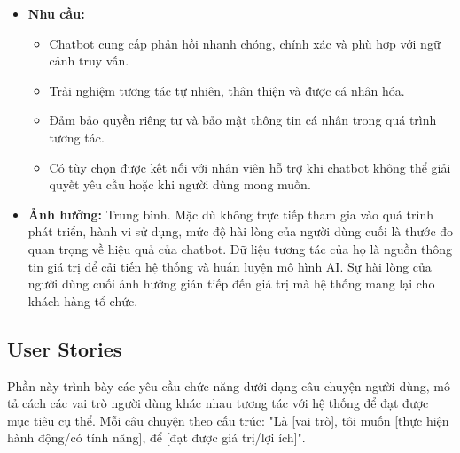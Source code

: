 \begin{itemize}
    \item \textbf{Nhu cầu:}
    \begin{itemize}
        \item Chatbot cung cấp phản hồi nhanh chóng, chính xác và phù hợp với ngữ cảnh truy vấn.
        \item Trải nghiệm tương tác tự nhiên, thân thiện và được cá nhân hóa.
        \item Đảm bảo quyền riêng tư và bảo mật thông tin cá nhân trong quá trình tương tác.
        \item Có tùy chọn được kết nối với nhân viên hỗ trợ khi chatbot không thể giải quyết yêu cầu hoặc khi người dùng mong muốn.
    \end{itemize}
    \item \textbf{Ảnh hưởng:} Trung bình. Mặc dù không trực tiếp tham gia vào quá trình phát triển, hành vi sử dụng, mức độ hài lòng của người dùng cuối là thước đo quan trọng về hiệu quả của chatbot. Dữ liệu tương tác của họ là nguồn thông tin giá trị để cải tiến hệ thống và huấn luyện mô hình AI. Sự hài lòng của người dùng cuối ảnh hưởng gián tiếp đến giá trị mà hệ thống mang lại cho khách hàng tổ chức.
\end{itemize}

\subsection{User Stories}

Phần này trình bày các yêu cầu chức năng dưới dạng câu chuyện người dùng, mô tả cách các vai trò người dùng khác nhau tương tác với hệ thống để đạt được mục tiêu cụ thể. Mỗi câu chuyện theo cấu trúc: "Là [vai trò], tôi muốn [thực hiện hành động/có tính năng], để [đạt được giá trị/lợi ích]".

